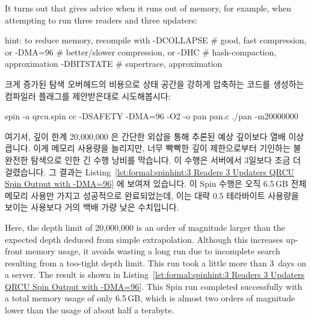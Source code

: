 It turns out that  gives advice when it runs out of memory,
for example, when attempting to run three readers and three updaters:

\fi

\begin{VerbatimU}
hint: to reduce memory, recompile with
  -DCOLLAPSE # good, fast compression, or
  -DMA=96   # better/slower compression, or
  -DHC # hash-compaction, approximation
  -DBITSTATE # supertrace, approximation
\end{VerbatimU}

크게 증가된 탐색 오버헤드의 비용으로 상태 공간을 강하게 압축하는 코드를
생성하는  컴파일러 플래그를 제안받은대로 시도해봅시다:

\iffalse

Let's try the suggested compiler flag \co{-DMA=N},
which generates code for aggressive compression of the
state space at the cost of greatly increased search overhead.
The required commands are as follows:

\fi

\begin{VerbatimU}
spin -a qrcu.spin
cc -DSAFETY -DMA=96 -O2 -o pan pan.c
./pan -m20000000
\end{VerbatimU}

여기서, 깊이 한계 20,000,000 은 간단한 외삽을 통해 추론된 예상 깊이보다 열배
이상 큽니다.
이게 메모리 사용량을 늘리지만, 너무 빡빡한 깊이 제한으로부터 기인하는 불완전한
탐색으로 인한 긴 수행 낭비를 막습니다.
이 수행은  서버에서 3일보다 조금 더 걸렸습니다.
그 결과는
Listing~\ref{lst:formal:spinhint:3 Readers 3 Updaters QRCU Spin Output with -DMA=96}
에 보여져 있습니다.
이 Spin 수행은 오직 6.5\,GB 전체 메모리 사용만 가지고 성공적으로 완료되었는데,
이는 대략 0.5 테라바이트 사용량을 보이는  사용보다 거의 백배
가량 낮은 수치입니다.

\iffalse

Here, the depth limit of 20,000,000 is an order of magnitude
larger than the expected depth deduced from simple extrapolation.
Although this increases up-front memory usage, it avoids wasting
a long run due to incomplete search resulting from a too-tight
depth limit.
This run took a little more than 3~days on a  server.
The result is shown in
Listing~\ref{lst:formal:spinhint:3 Readers 3 Updaters QRCU Spin Output with -DMA=96}.
This Spin run completed successfully with a total memory
usage of only 6.5\,GB, which is almost two orders of magnitude
lower than the  usage of about half a terabyte.

